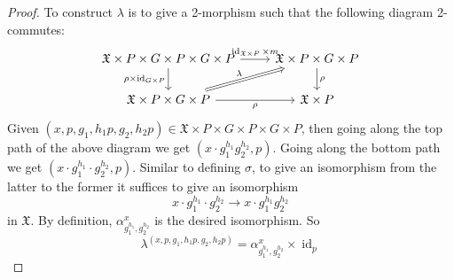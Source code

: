 \documentclass[10pt,a4paper]{amsart}
\newcommand{\fX}{{\mathfrak X}}
\DeclareMathOperator{\id}{id}
\begin{document}
\begin{proof}
    To construct $\lambda$ is to give a 2-morphism such that the following 
    diagram 2-commutes:
    $$
    \begin{tikzcd}
        {\fX\times P\times G \times P \times G \times P} & {\fX\times P \times G \times P} \\
        {\fX\times P \times G \times P} & {\fX\times P}
        \arrow["{\id_{\fX\times P}\times m}", from=1-1, to=1-2]
        \arrow["{\rho\times\id_{G\times P}}"', from=1-1, to=2-1]
        \arrow["\rho", from=1-2, to=2-2]
        \arrow["\lambda", Rightarrow, from=2-1, to=1-2]
        \arrow["\rho"', from=2-1, to=2-2]
    \end{tikzcd}
    $$
    Given 
    $(x,p,g_{1},h_{1}p,g_{2},h_{2}p) \in \fX\times P\times G \times P \times G \times P$,
    then going along the top path of the above diagram we get
    $(x\cdot g_{1}^{h_{1}}g_{2}^{h_{2}},p)$. Going along the bottom 
    path we get $(x \cdot g_{1}^{h_{1}}\cdot g_{2}^{h_{2}}, p)$.
    Similar to defining $\sigma$, to give an isomorphism from the latter to the former
    it suffices to give an isomorphism
    $$x \cdot g_{1}^{h_{1}}\cdot g_{2}^{h_{2}} \to x\cdot g_{1}^{h_{1}}g_{2}^{h_{2}} $$
    in $\fX$. By definition, 
    $\alpha_{g_{1}^{h_{1}}, g_{2}^{h_{2}}}^{x}$
    is the desired isomorphism. So 
    $$\lambda^{(x,p,g_1,h_1p,g_2,h_2p)}= \alpha_{g_{1}^{h_{1}},g_{2}^{h_{2}}}^{x} \times \id_{p}$$


\end{proof}
\end{document}

